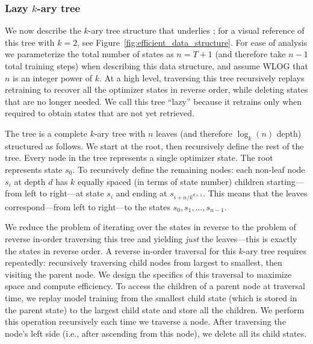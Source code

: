 \subsubsection{Lazy $k$-ary tree}
We now describe the $k$-ary tree structure that underlies \replay{}; for a
visual reference of this tree with $k=2$, see
Figure~\ref{fig:efficient_data_structure}. For ease of analysis we parameterize
the total number of states as $n=T+1$ (and therefore take $n-1$ total training steps) when
describing this data structure, and assume WLOG that $n$ is an integer power of
$k$. At a high level, traversing this tree recursively replays retraining to
recover all the optimizer states in reverse order, while deleting states that
are no longer needed. We call this tree ``lazy'' because it retrains only when
required to obtain states that are not yet retrieved.

The tree is a complete $k$-ary tree with $n$ leaves (and therefore $\log_k(n)$
depth) structured as follows. We start at the root, then recursively define the
rest of the tree. Every node in the tree represents a single optimizer state.
The root represents state $s_0$. To recursively define the remaining nodes: each
non-leaf node $s_i$ at depth $d$ has $k$ equally spaced (in terms of state
number) children starting---from left to right---at state $s_i$ and ending at
$s_{i + n/k^{d+1}}$. This means that the leaves correspond---from left to
right---to the states $s_0, s_1, \ldots, s_{n-1}$.

We reduce the problem of iterating over the states in reverse to the problem of
reverse in-order traversing this tree and yielding \textit{just} the
leaves---this is exactly the states in reverse order. A reverse in-order
traversal for this $k$-ary tree requires repeatedly: recursively traversing
child nodes from largest to smallest, then visiting the parent node. We design
the specifics of this traversal to maximize space and compute efficiency. To
access the children of a parent node at traversal time, we replay model training
from the smallest child state (which is stored in the parent state) to the
largest child state and store all the children. We perform this operation
recursively each time we traverse a node. After traversing the node's left side
(i.e., after ascending from this node), we delete all its child states.

